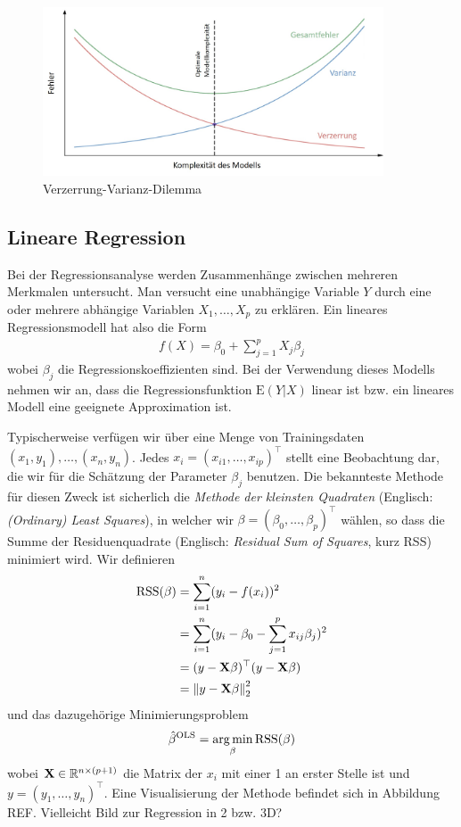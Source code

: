 \begin{figure}
\centering
\includegraphics[width = 0.9\textwidth]{figures/bias_variance_tradeoff_labeled.jpg}
\caption{Verzerrung-Varianz-Dilemma}
\label{bias_variance_tradeoff}
\end{figure}

\subsection{Lineare Regression} \cite{hastie_elements}

Bei der Regressionsanalyse werden Zusammenhänge zwischen
mehreren Merkmalen untersucht. Man versucht eine unabhängige Variable $Y$ durch eine oder mehrere abhängige Variablen $X_1, \ldots, X_p$ zu erklären. Ein lineares Regressionsmodell hat also die Form
\begin{align}
\label{linear_model}
f(X) = \beta_0 + \sum_{j=1}^p X_j\beta_j
\end{align}
wobei $\beta_j$ die Regressionskoeffizienten sind.
Bei der Verwendung dieses Modells nehmen wir an, dass die Regressionsfunktion $\text{E}(Y|X)$ linear ist bzw. ein lineares Modell eine geeignete Approximation ist.

Typischerweise verfügen wir über eine Menge von Trainingsdaten $(x_1, y_1), \ldots, (x_n, y_n)$. Jedes $x_i = (x_{i1}, \ldots, x_{ip})^{\top}$ stellt eine Beobachtung dar, die wir für die Schätzung der Parameter $\beta_j$ benutzen. Die bekannteste Methode für diesen Zweck ist sicherlich die \textit{Methode der kleinsten Quadraten} (Englisch: \textit{(Ordinary) Least Squares}), in welcher wir $\beta = (\beta_0, \ldots, \beta_p)^{\top}$ wählen, so dass die Summe der Residuenquadrate (Englisch: \textit{Residual Sum of Squares}, kurz RSS) minimiert wird. Wir definieren
\begin{align}
\label{RSS}
\text{RSS}(\beta) & = \sum_{i=1}^{n}(y_i - f(x_i))^2\\
& = \sum_{i=1}^{n}(y_i - \beta_0 - \sum_{j=1}^p x_{ij}\beta_j)^2\\
& = (y - \mathbf{X} \beta)^{\top}(y-\mathbf{X} \beta)\\
& = \left\lVert y - \mathbf{X} \beta \right\rVert_{2}^{2}
\end{align}
und das dazugehörige Minimierungsproblem
\begin{align}
\label{least_squares}
\hat{\beta}^{\text{OLS}} = \operatorname*{arg\,min}_{\beta} \text{RSS}(\beta)
\end{align}
wobei $\mathbf{X} \in \mathbb{R}^{n \times (p+1)}$ die Matrix der $x_i$ mit einer 1 an erster Stelle ist und $y = (y_1, \ldots, y_n)^{\top}$. Eine Visualisierung der Methode befindet sich in Abbildung REF. Vielleicht Bild zur Regression in 2 bzw. 3D?

